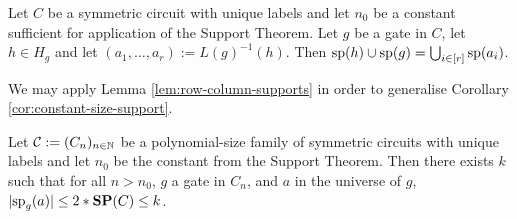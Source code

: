 \documentclass[../paper.tex]{subfiles}
\begin{document}
\begin{lem}
  Let $C$ be a symmetric circuit with unique labels and let $n_0$ be a constant
  sufficient for application of the Support Theorem. Let $g$ be a gate in $C$,
  let $h \in H_g$ and let $(a_1, \ldots, a_r) := L(g)^{-1}(h)$. Then $\text{sp}(h)
  \cup \text{sp}(g) = \bigcup_{i \in [r]} \text{sp}(a_i)$.
  \label{lem:row-column-supports}
\end{lem}

We may apply Lemma \ref{lem:row-column-supports} in order to generalise
Corollary \ref{cor:constant-size-support}.

\begin{cor}
  Let $\mathcal{C} := (C_n)_{n \in \mathbb{N}}$ be a polynomial-size family of
  symmetric circuits with unique labels and let $n_0$ be the constant from the
  Support Theorem. Then there exists $k$ such that for all $n > n_0$, $g$ a gate
  in $C_n$, and $a$ in the universe of $g$, $\vert \text{sp}_g(a) \vert \leq 2*
  \text{\textbf{SP}}(C) \leq k$.
  \label{col:constant-size-support-for-everything}
\end{cor}






\end{document}
